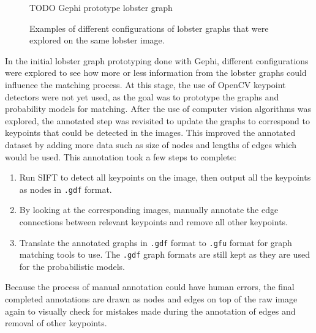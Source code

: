 \begin{figure}[H]
\centering
\begin{subfigure}{0.31\textwidth}

\end{subfigure}

\begin{subfigure}{0.31\textwidth}

\end{subfigure}

\begin{subfigure}{0.31\textwidth}

\end{subfigure}

TODO Gephi prototype lobster graph
\caption{Examples of different configurations of lobster graphs that were explored on the same lobster image.}
\end{figure}
\noindent
In the initial lobster graph prototyping done with Gephi, different configurations were explored to see how more or less information from the lobster graphs could influence the matching process. At this stage, the use of OpenCV keypoint detectors were not yet used, as the goal was to prototype the graphs and probability models for matching. 
\n
After the use of computer vision algorithms was explored, the annotated step was revisited to update the graphs to correspond to keypoints that could be detected in the images. This improved the annotated dataset by adding more data such as size of nodes and lengths of edges which would be used. This annotation took a few steps to complete:
\begin{enumerate}
\item Run SIFT to detect all keypoints on the image, then output all the keypoints as nodes in \texttt{.gdf} format.
\item By looking at the corresponding images, manually annotate the edge connections between relevant keypoints and remove all other keypoints.
\item Translate the annotated graphs in \texttt{.gdf} format to \texttt{.gfu} format for graph matching tools to use. The \texttt{.gdf} graph formats are still kept as they are used for the probabilistic models.
\end{enumerate}

\noindent
Because the process of manual annotation could have human errors, the final completed annotations are drawn as nodes and edges on top of the raw image again to visually check for mistakes made during the annotation of edges and removal of other keypoints.


